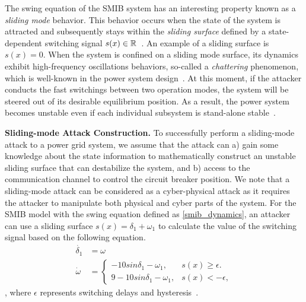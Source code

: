 The swing equation of the SMIB system has an interesting property known as a \emph{sliding mode} behavior. This behavior occurs when the state of the system is attracted and subsequently stays within the \emph{sliding surface} defined by a state-dependent switching signal $s(x)\in\mathbb{R}$~\cite{decarlo1988variable, liu2014coordinated}. An example of a sliding surface is $s(x) = 0$. When the system is confined on a sliding mode surface, its dynamics exhibit high-frequency oscillations behaviors, so-called a \emph{chattering} phenomenon, which is well-known in the power system design~\cite{sabanovic2004variable}.
%
At this moment, if the attacker conducts the fast switchings between two  operation modes, the system will be steered out of its desirable equilibrium position. As a result, the power system becomes unstable even if each individual subsystem is stand-alone stable~\cite{liu2014coordinated}.  
% 

\vspace{0.5em}
\noindent
{\bf Sliding-mode Attack Construction.} To successfully perform a sliding-mode attack to a power grid system, we assume that the attack can a) gain some knowledge about the state information to mathematically construct an unstable sliding surface that can destabilize the system, and b) access to the communication channel to control the circuit breaker position. We note that a sliding-mode attack can be considered as a cyber-physical attack as it requires the attacker to manipulate both physical and cyber parts of the system. For the SMIB model with the swing equation defined as \eqref{smib_dynamics}, an attacker can use a sliding surface $s(x) = \delta_1 + \omega_1$ to calculate the value of the switching signal based on the following equation.
%
\begin{align}
\dot{\delta_1} & = \omega \nonumber \\
\dot{\omega} & = 
\begin{cases}
    -10sin\delta_1 - \omega_1, & \text{$s(x) \geq \epsilon$}.\\
    9 - 10sin\delta_1 - \omega_1, & \text{$s(x) < -\epsilon$},
 \end{cases} 
\end{align},
where $\epsilon$ represents switching delays and hysteresis~\cite{liu2011class}.
%


